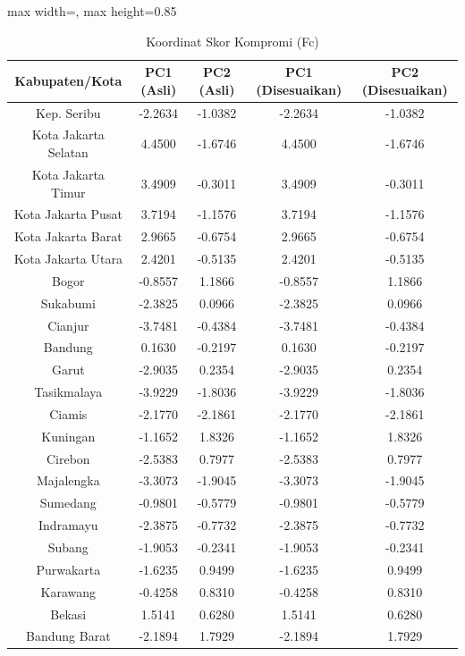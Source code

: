 \begin{table}[H]
\centering
\caption{Koordinat Skor Kompromi (Fc)} \label{tab:appscores}
\begin{adjustbox}{max width=\textwidth, max height=0.85\textheight}
\begin{tabular}{|c|c|c|c|c|}
\hline
\textbf{Kabupaten/Kota} & \textbf{PC1 (Asli)} & \textbf{PC2 (Asli)} & \textbf{PC1 (Disesuaikan)} & \textbf{PC2 (Disesuaikan)} \\
\hline
Kep. Seribu & -2.2634 & -1.0382 & -2.2634 & -1.0382 \\
Kota Jakarta Selatan & 4.4500 & -1.6746 & 4.4500 & -1.6746 \\
Kota Jakarta Timur & 3.4909 & -0.3011 & 3.4909 & -0.3011 \\
Kota Jakarta Pusat & 3.7194 & -1.1576 & 3.7194 & -1.1576 \\
Kota Jakarta Barat & 2.9665 & -0.6754 & 2.9665 & -0.6754 \\
Kota Jakarta Utara & 2.4201 & -0.5135 & 2.4201 & -0.5135 \\
Bogor & -0.8557 & 1.1866 & -0.8557 & 1.1866 \\
Sukabumi & -2.3825 & 0.0966 & -2.3825 & 0.0966 \\
Cianjur & -3.7481 & -0.4384 & -3.7481 & -0.4384 \\
Bandung & 0.1630 & -0.2197 & 0.1630 & -0.2197 \\
Garut & -2.9035 & 0.2354 & -2.9035 & 0.2354 \\
Tasikmalaya & -3.9229 & -1.8036 & -3.9229 & -1.8036 \\
Ciamis & -2.1770 & -2.1861 & -2.1770 & -2.1861 \\
Kuningan & -1.1652 & 1.8326 & -1.1652 & 1.8326 \\
Cirebon & -2.5383 & 0.7977 & -2.5383 & 0.7977 \\
Majalengka & -3.3073 & -1.9045 & -3.3073 & -1.9045 \\
Sumedang & -0.9801 & -0.5779 & -0.9801 & -0.5779 \\
Indramayu & -2.3875 & -0.7732 & -2.3875 & -0.7732 \\
Subang & -1.9053 & -0.2341 & -1.9053 & -0.2341 \\
Purwakarta & -1.6235 & 0.9499 & -1.6235 & 0.9499 \\
Karawang & -0.4258 & 0.8310 & -0.4258 & 0.8310 \\
Bekasi & 1.5141 & 0.6280 & 1.5141 & 0.6280 \\
Bandung Barat & -2.1894 & 1.7929 & -2.1894 & 1.7929 \\

\end{tabular}
\end{adjustbox}
\end{table}
